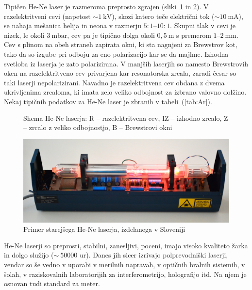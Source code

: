 Tipičen He-Ne laser je razmeroma preprosto zgrajen (sliki~\ref{fig:HeNeShema}
in \ref{fig:Iskra}).
V razelektritveni cevi (napetost  $\sim 1~\si{\kilo\volt}$), skozi
katero teče električni tok ($\sim 10~\si{\milli\ampere}$), 
se nahaja mešanica helija in neona v razmerju 
$5:1$--$10:1$. Skupni tlak v cevi je nizek, le okoli $3~\si{\milli\bar}$, 
cev pa je tipično dolga okoli $0,5~\si{\metre}$ s premerom $1$--$2~\si{\milli\metre}$.  
Cev s plinom na obeh straneh zapirata okni, ki sta nagnjeni za Brewstrov kot, 
tako da so izgube pri odboju za eno polarizacijo kar se da majhne.
Izhodna svetloba iz laserja je zato polarizirana. V manjših laserjih
so namesto Brewstrovih oken na razelektritveno cev privarjena kar
resonatorska zrcala, zaradi česar so taki laserji nepolarizirani. 
Navadno je razelektritvena cev obdana z dvema ukrivljenima zrcaloma, 
ki imata zelo veliko odbojnost za izbrano valovno dolžino.
Nekaj tipičnih podatkov za He-Ne laser je zbranih v tabeli~(\ref{tab:Ar}).
\begin{figure}[h]
\centering
\def\svgwidth{100truemm} 

\caption{Shema He-Ne laserja: R -- razelektritvena cev, IZ -- izhodno zrcalo, Z -- zrcalo
z veliko odbojnostjo, B -- Brewstrovi okni}
\label{fig:HeNeShema}
\end{figure}

\begin{figure}[h]
\centering
\includegraphics[width=120truemm]{slike/07_HeNe.jpg}
\caption{Primer starejšega He-Ne laserja, izdelanega v Sloveniji}
\label{fig:Iskra}
\end{figure}

He-Ne laserji so preprosti, stabilni, zanesljivi, poceni, imajo visoko kvaliteto žarka
in dolgo služijo ($\sim~50 000$ ur).
Danes jih sicer izrivajo polprevodniški laserji, vendar so še vedno v uporabi
v merilnih napravah, v optičnih bralnih sistemih, v šolah, v raziskovalnih 
laboratorijih za interferometrijo, holografijo itd. Na njem je osnovan tudi 
standard za meter.

